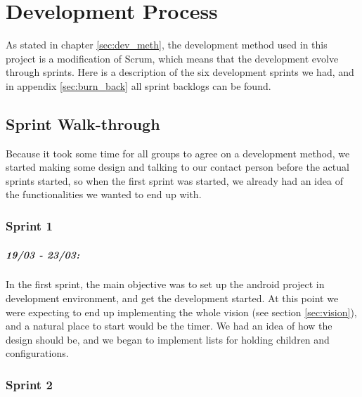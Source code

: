 \chapter{Development Process}
As stated in chapter \ref{sec:dev_meth}, the development method used in this project is a modification of Scrum, which means that the development evolve through sprints. Here is a description of the six development sprints we had, and in appendix \ref{sec:burn_back} all sprint backlogs can be found.

\section{Sprint Walk-through}
Because it took some time for all groups to agree on a development method, we started making some design and talking to our contact person before the actual sprints started, so when the first sprint was started, we already had an idea of the functionalities we wanted to end up with.

\subsection*{Sprint 1}
\paragraph{19/03 - 23/03:}
In the first sprint, the main objective was to set up the android project in development environment, and get the development started. At this point we were expecting to end up implementing the whole vision (see section \ref{sec:vision}), and a natural place to start would be the timer. We had an idea of how the design should be, and we began to implement lists for holding children and configurations.

\subsection*{Sprint 2}

